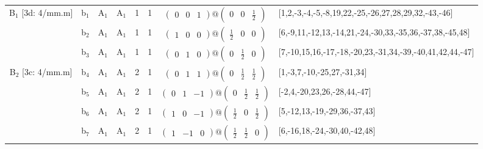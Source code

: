 \documentclass[fleqn,10pt,landscape]{article}
\begin{document}
\begin{itemize}
\begin{center}
\begin{longtable}{cc|cc|c|c|c|l}
B$_{1}$ [3d: 4/mm.m] & b$_{1}$ & A$_{1}$ & A$_{1}$ & 1 & 1 & $\begin{pmatrix} 0 & 0 & 1 \end{pmatrix}@\begin{pmatrix} 0 & 0 & \frac{1}{2} \end{pmatrix}$ & [1,2,-3,-4,-5,-8,19,22,-25,-26,27,28,29,32,-43,-46] \\
& b$_{2}$ & A$_{1}$ & A$_{1}$ & 1 & 1 & $\begin{pmatrix} 1 & 0 & 0 \end{pmatrix}@\begin{pmatrix} \frac{1}{2} & 0 & 0 \end{pmatrix}$ & [6,-9,11,-12,13,-14,21,-24,-30,33,-35,36,-37,38,-45,48] \\
& b$_{3}$ & A$_{1}$ & A$_{1}$ & 1 & 1 & $\begin{pmatrix} 0 & 1 & 0 \end{pmatrix}@\begin{pmatrix} 0 & \frac{1}{2} & 0 \end{pmatrix}$ & [7,-10,15,16,-17,-18,-20,23,-31,34,-39,-40,41,42,44,-47] \\ \hline
B$_{2}$ [3c: 4/mm.m] & b$_{4}$ & A$_{1}$ & A$_{1}$ & 2 & 1 & $\begin{pmatrix} 0 & 1 & 1 \end{pmatrix}@\begin{pmatrix} 0 & \frac{1}{2} & \frac{1}{2} \end{pmatrix}$ & [1,-3,7,-10,-25,27,-31,34] \\
& b$_{5}$ & A$_{1}$ & A$_{1}$ & 2 & 1 & $\begin{pmatrix} 0 & 1 & -1 \end{pmatrix}@\begin{pmatrix} 0 & \frac{1}{2} & \frac{1}{2} \end{pmatrix}$ & [-2,4,-20,23,26,-28,44,-47] \\
& b$_{6}$ & A$_{1}$ & A$_{1}$ & 2 & 1 & $\begin{pmatrix} 1 & 0 & -1 \end{pmatrix}@\begin{pmatrix} \frac{1}{2} & 0 & \frac{1}{2} \end{pmatrix}$ & [5,-12,13,-19,-29,36,-37,43] \\
& b$_{7}$ & A$_{1}$ & A$_{1}$ & 2 & 1 & $\begin{pmatrix} 1 & -1 & 0 \end{pmatrix}@\begin{pmatrix} \frac{1}{2} & \frac{1}{2} & 0 \end{pmatrix}$ & [6,-16,18,-24,-30,40,-42,48] \\

\end{longtable}
\end{center}
\end{itemize}
\end{document}
